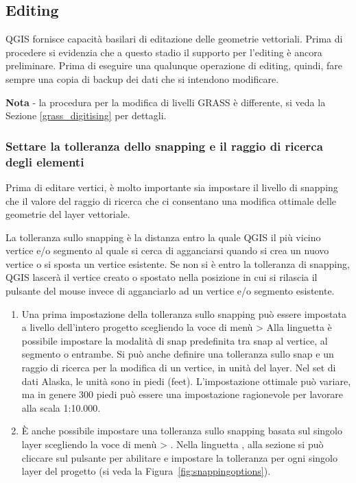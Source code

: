 \subsection{Editing}

QGIS fornisce capacità basilari di editazione delle geometrie vettoriali.
Prima di procedere si evidenzia che a questo stadio il supporto per l'editing
è ancora preliminare.
Prima di eseguire una qualunque operazione di editing, quindi, fare sempre una
copia di backup dei dati che si intendono modificare. 

\textbf{Nota} - la procedura per la modifica di livelli GRASS è differente, si
veda la Sezione \ref{grass_digitising} per dettagli.

\subsubsection{Settare la tolleranza dello snapping e il raggio di ricerca
degli elementi}

Prima di editare vertici, è molto importante sia impostare il livello di snapping
che il valore del raggio di ricerca che ci consentano una modifica ottimale delle
geometrie del layer vettoriale. 


La tolleranza sullo snapping è la distanza entro la quale QGIS
 il più vicino vertice e/o segmento al quale si cerca di
agganciarsi quando si crea un nuovo vertice o si sposta un vertice esistente.
Se non si è entro la tolleranza di snapping, QGIS lascerà il vertice creato o
spostato nella posizione in cui si rilascia il pulsante del mouse invece di
agganciarlo ad un vertice e/o segmento esistente. 

\begin{enumerate}
\item Una prima impostazione della tolleranza sullo snapping può essere
impostata a livello dell'intero progetto scegliendo la voce di menù  > 
Alla linguetta  è possibile impostare la modalità di
snap predefinita tra snap al vertice, al segmento o entrambe. Si può anche
definire una tolleranza sullo snap e un raggio di ricerca per la modifica di
un vertice, in unità del layer. Nel set di dati Alaska, le unità sono in piedi
(feet). L'impostazione ottimale può variare, ma in genere 300 piedi può essere
una impostazione ragionevole per lavorare alla scala 1:10.000.
\item È anche possibile impostare una tolleranza sullo snapping basata sul
singolo layer scegliendo la voce di menù  >
. Nella linguetta
, alla sezione  si può cliccare sul
pulsante  per abilitare e impostare la tolleranza
per ogni singolo layer del progetto (si veda la Figura~\ref{fig:snappingoptions}).
\end{enumerate}

